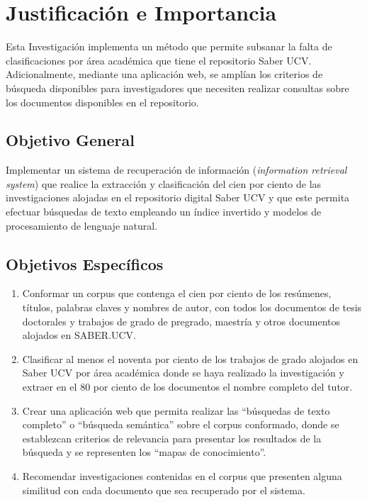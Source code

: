 \documentclass[
  12pt,
  openany]{book}
\begin{document}
\hypertarget{justificacion}{%
\section{Justificación e Importancia}\label{justificacion}}

Esta Investigación implementa un método que permite subsanar la falta de clasificaciones por área académica que tiene el repositorio Saber UCV. Adicionalmente, mediante una aplicación web, se amplían los criterios de búsqueda disponibles para investigadores que necesiten realizar consultas sobre los documentos disponibles en el repositorio.

\hypertarget{objegeneral}{%
\subsection{Objetivo General}\label{objegeneral}}

Implementar un sistema de recuperación de información (\emph{information retrieval system}) que realice la extracción y clasificación del cien por ciento de las investigaciones alojadas en el repositorio digital Saber UCV y que este permita efectuar búsquedas de texto empleando un índice invertido y modelos de procesamiento de lenguaje natural.

\hypertarget{objeespe}{%
\subsection{Objetivos Específicos}\label{objeespe}}

\begin{enumerate}
\def\labelenumi{\arabic{enumi}.}
\item
  Conformar un corpus que contenga el cien por ciento de los resúmenes, títulos, palabras claves y nombres de autor, con todos los documentos de tesis doctorales y trabajos de grado de pregrado, maestría y otros documentos alojados en SABER.UCV.
\item
  Clasificar al menos el noventa por ciento de los trabajos de grado alojados en Saber UCV por área académica donde se haya realizado la investigación y extraer en el 80 por ciento de los documentos el nombre completo del tutor.
\item
  Crear una aplicación web que permita realizar las ``búsquedas de texto completo'' o ``búsqueda semántica'' sobre el corpus conformado, donde se establezcan criterios de relevancia para presentar los resultados de la búsqueda y se representen los ``mapas de conocimiento''.
\item
  Recomendar investigaciones contenidas en el corpus que presenten alguna similitud con cada documento que sea recuperado por el sistema.
\end{enumerate}
\end{document}

